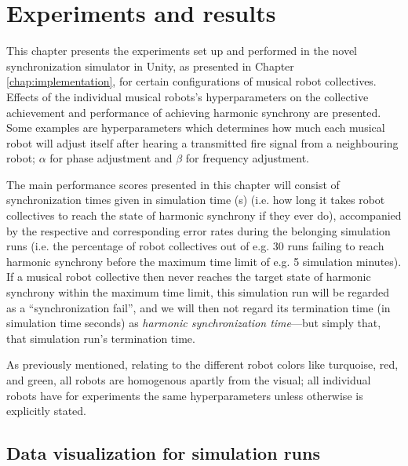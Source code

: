 \chapter{Experiments and results}
\label{chap:experiments_and_results}

This chapter presents the experiments set up and performed in the novel synchronization simulator in Unity, as presented in Chapter \ref{chap:implementation}, for certain configurations of musical robot collectives. Effects of the individual musical robots's hyperparameters on the collective achievement and performance of achieving harmonic synchrony are presented. Some examples are hyperparameters which determines how much each musical robot will adjust itself after hearing a transmitted fire signal from a neighbouring robot; $\alpha$ for phase adjustment and $\beta$ for frequency adjustment.

The main performance scores presented in this chapter will consist of synchronization times given in simulation time (s) (i.e. how long it takes robot collectives to reach the state of harmonic synchrony if they ever do), accompanied by the respective and corresponding error rates during the belonging simulation runs (i.e. the percentage of robot collectives out of e.g. 30 runs failing to reach harmonic synchrony before the maximum time limit of e.g. 5 simulation minutes). If a musical robot collective then never reaches the target state of harmonic synchrony within the maximum time limit, this simulation run will be regarded as a ``synchronization fail'', and we will then not regard its termination time (in simulation time seconds) as \textit{harmonic synchronization time}—but simply that, that simulation run's termination time.

As previously mentioned, relating to the different robot colors like turquoise, red, and green, all robots are homogenous apartly from the visual; all individual robots have for experiments the same hyperparameters unless otherwise is explicitly stated.



\section{Data visualization for simulation runs}



